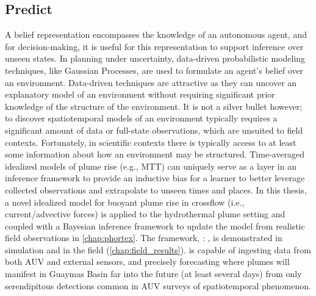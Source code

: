 \subsection{Predict}
A belief representation encompasses the knowledge of an autonomous agent, and for decision-making, it is useful for this representation to support inference over unseen states. 
In planning under uncertainty, data-driven probabilistic modeling techniques, like Gaussian Processes\autocite{Rasmussen2004}, are used to formulate an agent's belief over an environment.
Data-driven techniques are attractive as they can uncover an explanatory model of an environment without requiring significant prior knowledge of the structure of the environment.
It is not a silver bullet however; to discover spatiotemporal models of an environment typically requires a significant amount of data or full-state observations, which are unsuited to field contexts.
Fortunately, in scientific contexts there is typically access to at least some information about how an environment may be structured.
Time-averaged idealized models of plume rise (e.g., MTT\autocite{morton1956turbulent}) can uniquely serve as a layer in an inference framework to provide an inductive bias for a learner to better leverage collected observations and extrapolate to unseen times and places.
In this thesis, a novel idealized model for buoyant plume rise in crossflow (i.e., current/advective forces) is applied to the hydrothermal plume setting\autocite{tohidi2016highly} and coupled with a Bayesian inference framework to update the model from realistic field observations in \cref{chap:phortex}.
The framework, \PHUMES: \phumes, is demonstrated in simulation and in the field (\cref{chap:field_results}).
\PHUMES is capable of ingesting data from both AUV \Sentry and external sensors, and precisely forecasting where plumes will manifest in Guaymas Basin far into the future (at least several days) from only serendipitous detections common in AUV surveys of spatiotemporal phenomenon.

